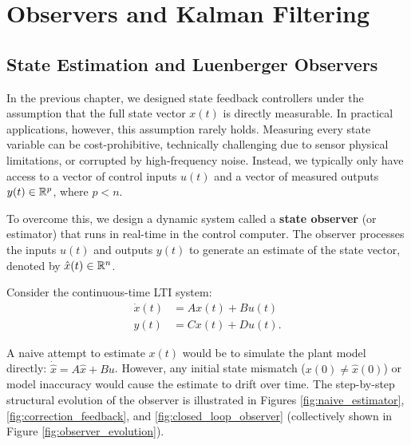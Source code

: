 \chapter{Observers and Kalman Filtering}

\section{State Estimation and Luenberger Observers}
In the previous chapter, we designed state feedback controllers under the assumption that the full state vector $x(t)$ is directly measurable. In practical applications, however, this assumption rarely holds. Measuring every state variable can be cost-prohibitive, technically challenging due to sensor physical limitations, or corrupted by high-frequency noise. Instead, we typically only have access to a vector of control inputs $u(t)$ and a vector of measured outputs $y(t) \in \mathbb{R}^p$, where $p < n$.

To overcome this, we design a dynamic system called a \textbf{state observer} (or estimator) that runs in real-time in the control computer. The observer processes the inputs $u(t)$ and outputs $y(t)$ to generate an estimate of the state vector, denoted by $\hat{x}(t) \in \mathbb{R}^n$.

Consider the continuous-time LTI system:
\begin{align}
    \dot{x}(t) &= A x(t) + B u(t) \label{eq:obs_plant_state} \\
    y(t) &= C x(t) + D u(t) . \label{eq:obs_plant_output}
\end{align}

A naive attempt to estimate $x(t)$ would be to simulate the plant model directly: $\dot{\hat{x}} = A \hat{x} + B u$. However, any initial state mismatch ($x(0) \neq \hat{x}(0)$) or model inaccuracy would cause the estimate to drift over time. 
The step-by-step structural evolution of the observer is illustrated in Figures \ref{fig:naive_estimator}, \ref{fig:correction_feedback}, and \ref{fig:closed_loop_observer} (collectively shown in Figure \ref{fig:observer_evolution}).

